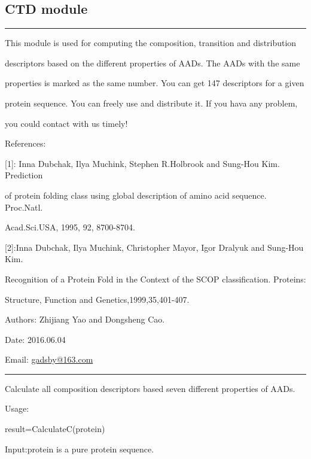 \documentclass[letterpaper,10pt,english]{sphinxmanual}
\begin{document}
\subsection{CTD module}
\label{reference/CTD::doc}\label{reference/CTD:ctd-module}\label{reference/CTD:module-CTD}

\bigskip\hrule{}\bigskip


This module is used for computing the composition, transition and distribution

descriptors based on the different properties of AADs. The AADs with the same

properties is marked as the same number. You can get 147 descriptors for a given

protein sequence. You can freely use and distribute it. If you hava  any problem,

you could contact with us timely!

References:

{[}1{]}: Inna Dubchak, Ilya Muchink, Stephen R.Holbrook and Sung-Hou Kim. Prediction

of protein folding class using global description of amino acid sequence. Proc.Natl.

Acad.Sci.USA, 1995, 92, 8700-8704.

{[}2{]}:Inna Dubchak, Ilya Muchink, Christopher Mayor, Igor Dralyuk and Sung-Hou Kim.

Recognition of a Protein Fold in the Context of the SCOP classification. Proteins:

Structure, Function and Genetics,1999,35,401-407.

Authors: Zhijiang Yao and Dongsheng Cao.

Date: 2016.06.04

Email: \href{mailto:gadsby@163.com}{gadsby@163.com}


\bigskip\hrule{}\bigskip


\begin{fulllineitems}
\label{reference/CTD:CTD.CalculateC}
Calculate all composition descriptors based seven different properties of AADs.

Usage:

result=CalculateC(protein)

Input:protein is a pure protein sequence.

\end{fulllineitems}
\end{document}
